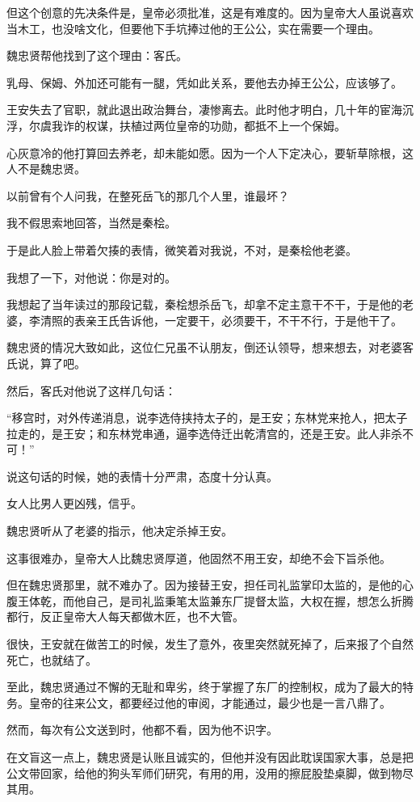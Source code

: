 \begin{multicols}{\theparacolNo}
		但这个创意的先决条件是，皇帝必须批准，这是有难度的。因为皇帝大人虽说喜欢当木工，也没啥文化，但要他下手坑捧过他的王公公，实在需要一个理由。

		魏忠贤帮他找到了这个理由：客氏。

		乳母、保姆、外加还可能有一腿，凭如此关系，要他去办掉王公公，应该够了。

		王安失去了官职，就此退出政治舞台，凄惨离去。此时他才明白，几十年的宦海沉浮，尔虞我诈的权谋，扶植过两位皇帝的功勋，都抵不上一个保姆。

		心灰意冷的他打算回去养老，却未能如愿。因为一个人下定决心，要斩草除根，这人不是魏忠贤。

		以前曾有个人问我，在整死岳飞的那几个人里，谁最坏？

		我不假思索地回答，当然是秦桧。

		于是此人脸上带着欠揍的表情，微笑着对我说，不对，是秦桧他老婆。

		我想了一下，对他说：你是对的。

		我想起了当年读过的那段记载，秦桧想杀岳飞，却拿不定主意干不干，于是他的老婆，李清照的表亲王氏告诉他，一定要干，必须要干，不干不行，于是他干了。

		魏忠贤的情况大致如此，这位仁兄虽不认朋友，倒还认领导，想来想去，对老婆客氏说，算了吧。

		然后，客氏对他说了这样几句话：

		“移宫时，对外传递消息，说李选侍挟持太子的，是王安；东林党来抢人，把太子拉走的，是王安；和东林党串通，逼李选侍迁出乾清宫的，还是王安。此人非杀不可！”

		说这句话的时候，她的表情十分严肃，态度十分认真。

		女人比男人更凶残，信乎。

		魏忠贤听从了老婆的指示，他决定杀掉王安。

		这事很难办，皇帝大人比魏忠贤厚道，他固然不用王安，却绝不会下旨杀他。

		但在魏忠贤那里，就不难办了。因为接替王安，担任司礼监掌印太监的，是他的心腹王体乾，而他自己，是司礼监秉笔太监兼东厂提督太监，大权在握，想怎么折腾都行，反正皇帝大人每天都做木匠，也不大管。

		很快，王安就在做苦工的时候，发生了意外，夜里突然就死掉了，后来报了个自然死亡，也就结了。

		至此，魏忠贤通过不懈的无耻和卑劣，终于掌握了东厂的控制权，成为了最大的特务。皇帝的往来公文，都要经过他的审阅，才能通过，最少也是一言八鼎了。

		然而，每次有公文送到时，他都不看，因为他不识字。

		在文盲这一点上，魏忠贤是认账且诚实的，但他并没有因此耽误国家大事，总是把公文带回家，给他的狗头军师们研究，有用的用，没用的擦屁股垫桌脚，做到物尽其用。

		\ifnum{}
	\end{multicols}
\fi
\newpage
